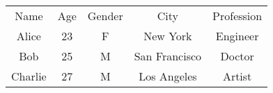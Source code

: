 \documentclass{article}
\begin{document}
\begin{tabular}{c c c c c}
Name & Age & Gender & City & Profession \\
Alice & 23 & F & New York & Engineer \\
Bob & 25 & M & San Francisco & Doctor \\
Charlie & 27 & M & Los Angeles & Artist \\
\end{tabular}
\end{document}
